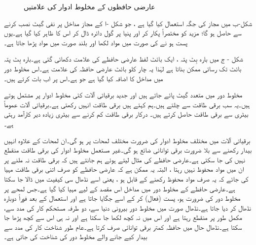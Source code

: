 \begin{figure}
\begin{subfigure}[b]{0.3\textwidth}
\caption{}
\end{subfigure}
\caption{عارضی حافظوں کے مخلوط ادوار کی علامتیں}
\label{شکل_حافظہ_عارضی_حافظوں_کے_مخلوط_ادوار}
\end{figure}
شکل-ب میں مجاز کی جگہ  استعمال کیا گیا ہے ، جو شکل -ا کے مجاز مداخل پر نفی گیٹ نصب کرنے سے حاصل ہو گا؛ مزید  کو مختصراً  پکار کر اور  پنیا پر گول دائرہ ڈال کر اس کا  ظاہر کیا گیا ہے۔یوں  پست ہو نے کی صورت میں مواد لکھا اور بلند صورت میں  مواد پڑھا جاتا ہے۔

شکل - ج میں بارہ بِٹ پتہ ، ایک بائٹ لفظ عارضی حافظے کی علامت دکھائی گئی ہے۔بارہ بِٹ پتہ  بائٹ تک رسائی ممکن بناتا ہے لہٰذا یہ چار کلو بائٹ عارضی حافظہ کی علامت ہے۔اس مخلوط دور میں  مداخل  کا اضافہ کیا گیا ہے جو ہے۔اس پر اب بات کرتے ہیں۔

 مخلوط دور میں متعدد گیٹ پائے جاتے ہیں اور جدید برقیاتی آلات کئی مخلوط ادوار پر مشتمل ہوتے ہیں۔یہ سب برقی طاقت سے چلتے ہیں۔ہم کہتے ہیں برقی طاقت انہیں  رکھتی ہے۔برقیاتی آلات عموماً بیٹری سے برقی طاقت حاصل کرتے ہیں۔ درکار برقی طاقت کم کرنے سے بیٹری زیادہ دیر کارآمد رہتی ہے۔
 
برقیاتی آلات میں مختلف مخلوط ادوار کی ضرورت مختلف لمحات پر ہو گی۔ان لمحات کے علاوہ انہیں بیدار رکھنے سے بلا ضرورت برقی توانائی ضائع ہو گی۔غیر مستعمل مخلوط ادوار کی برقی طاقت منقطع نہیں کی جا سکتی ہے۔عارضی حافظے کی مثال لیتے ہوئے ہم جانتے ہیں کہ برقی طاقت نہ ملنے پر ان میں مواد محفوظ نہیں رہتا ، البتہ یہ ممکن ہے کہ عارضی حافظے کو صرف اتنی برقی طاقت مہیا کی جائے کہ یہ صرف مواد محفوظ رکھنے کے قابل ہو ، یعنی اسے نڈھال سی کیفیت میں ڈالا جا سکتا ہے۔عارضی حافظے کے مخلوط دور میں  مداخل اس مقصد کے لیے مہیا کیا گیا ہے۔جس لمحے پر مخلوط دور کی ضرورت ہو،  پست (فعال) کر کے اسے جگایا جاتا ہے اور استعمال کے بعد فوراً دوبارہ نڈھال کر دیا جاتا ہے۔نڈھال صورت میں مخلوط دور بیرونی دنیا سے، دو طرفہ مستحکم کار کی مدد سے، مکمل طور پر منقطع رہتا ہے اور اس میں نہ کچھ لکھا جا سکتا ہے اور نہ ہی اس سے کچھ پڑھا جا سکتا ہے۔نڈھال حال میں حافظہ کمتر برقی توانائی صرف کرتا ہے۔عام طور شناخت کار کی مدد سے بیدار کیے جانے والے مخلوط دور کی شناخت کی جاتی ہے۔

